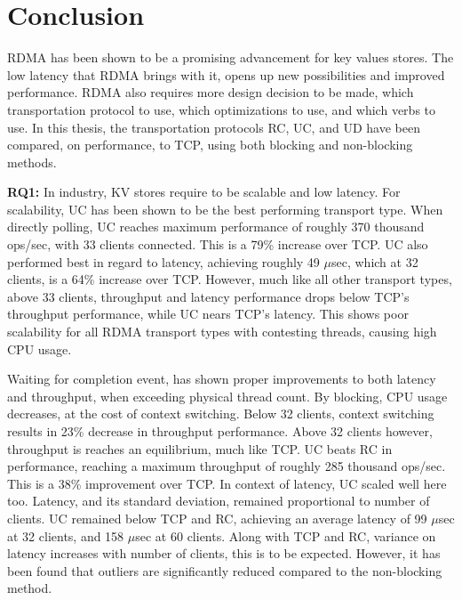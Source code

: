 
\chapter{Conclusion}\label{ch:conclusion} %



\ifpdf
    \graphicspath{{7/figures/PNG/}{7/figures/PDF/}{7/figures/}}
\else
    \graphicspath{{7/figures/EPS/}{7/figures/}}
\fi


%
RDMA has been shown to be a promising advancement for key values stores.
The low latency that RDMA brings with it, opens up new possibilities and improved performance.
RDMA also requires more design decision to be made, which transportation protocol to use, which optimizations to use, and which verbs to use.
In this thesis, the transportation protocols RC, UC, and UD have been compared, on performance, to TCP, using both blocking and non-blocking methods.

\textbf{RQ1:} In industry, KV stores require to be scalable and low latency.
For scalability, UC has been shown to be the best performing transport type.
When directly polling, UC reaches maximum performance of roughly 370 thousand ops/sec, with 33 clients connected.
This is a 79\% increase over TCP.
UC also performed best in regard to latency, achieving roughly 49 $\mu$sec, which at 32 clients, is a 64\% increase over TCP.
However, much like all other transport types, above 33 clients, throughput and latency performance drops below TCP's throughput performance, while UC nears TCP's latency.
This shows poor scalability for all RDMA transport types with contesting threads, causing high CPU usage.

Waiting for completion event, has shown proper improvements to both latency and throughput, when exceeding physical thread count.
By blocking, CPU usage decreases, at the cost of context switching.
Below 32 clients, context switching results in 23\% decrease in throughput performance.
Above 32 clients however, throughput is reaches an equilibrium, much like TCP.
UC beats RC in performance, reaching a maximum throughput of roughly 285 thousand ops/sec.
This is a 38\% improvement over TCP.
In context of latency, UC scaled well here too.
Latency, and its standard deviation, remained proportional to number of clients.
UC remained below TCP and RC, achieving an average latency of 99 $\mu$sec at 32 clients, and 158 $\mu$sec at 60 clients.
Along with TCP and RC, variance on latency increases with number of clients, this is to be expected.
However, it has been found that outliers are significantly reduced compared to the non-blocking method.

